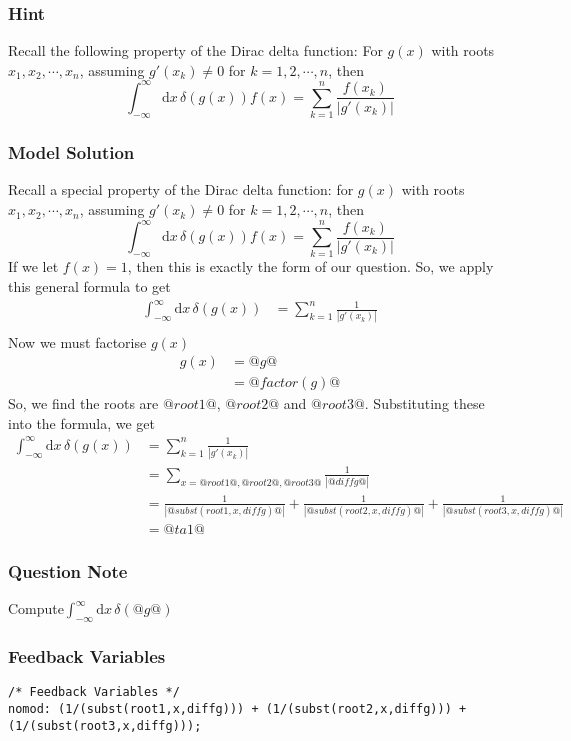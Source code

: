 \documentclass[a4paper,10pt]{article}
\begin{document}
\subsubsection{Hint}
Recall the following property of the Dirac delta function: For \(g(x)\) with roots \(x_1, x_2, \cdots, x_n\), assuming \(g'(x_k) \neq 0 \) for \(k=1,2,\cdots,n\), then \[ \int_{-\infty}^{\infty} \text{d}x \, \delta(g(x))f(x) = \sum_{k=1}^{n}\frac{f(x_k)}{|g'(x_k)|} \]
\subsubsection{Model Solution}
Recall a special property of the Dirac delta function: for \(g(x)\) with roots \(x_1, x_2, \cdots, x_n\), assuming \(g'(x_k) \neq 0 \) for \(k=1,2,\cdots,n\), then \[ \int_{-\infty}^{\infty} \text{d}x \, \delta(g(x))f(x) = \sum_{k=1}^{n}\frac{f(x_k)}{|g'(x_k)|} \] If we let \(f(x)=1\), then this is exactly the form of our question. So, we apply this general formula to get \begin{align*} \int_{-\infty}^{\infty} \text{d}x \, \delta(g(x)) &= \sum_{k=1}^{n}\frac{1}{|g'(x_k)|} \\ \end{align*}Now we must factorise \(g(x)\) \begin{align*} g(x) &= @g@ \\ &= @factor(g)@ \end{align*}So, we find the roots are \(@root1@\), \(@root2@\) and \(@root3@\). Substituting these into the formula, we get \begin{align*} \int_{-\infty}^{\infty} \text{d}x \, \delta(g(x)) &= \sum_{k=1}^{n}\frac{1}{|g'(x_k)|} \\ &= \sum_{x = @root1@, @root2@, @root3@} \frac{1}{|@diffg@|} \\ &= \frac{1}{|@subst(root1,x,diffg)@|} + \frac{1}{|@subst(root2,x,diffg)@|} + \frac{1}{|@subst(root3,x,diffg)@|} \\ &= @ta1@ \end{align*}
\subsubsection{Question Note}
Compute\(\int_{-\infty}^{\infty} \text{d}x \, \delta(@g@)\)
\subsubsection{Feedback Variables}
\begin{lstlisting}
/* Feedback Variables */
nomod: (1/(subst(root1,x,diffg))) + (1/(subst(root2,x,diffg))) + (1/(subst(root3,x,diffg)));
\end{lstlisting}
\end{document}
